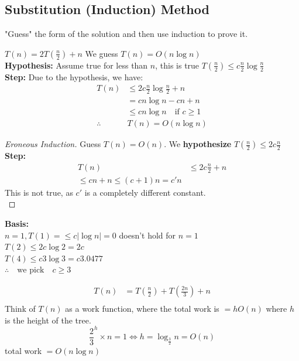 \subsection{Substitution (Induction) Method}
\begin{remark}
    "Guess" the form of the solution and then use induction to prove it.
\end{remark}

\begin{example}
    \label{ex:substitution_method}
    $T(n) = 2T\left(\frac{n}{2}\right) + n$ We guess $T(n) = O(n\log n)$\\
    \textbf{Hypothesis:} Assume true for less than $n$, this is true $T(\frac{n}{2}) \leq c\frac{n}{2}\log\frac{n}{2}$\\
    \textbf{Step: }
    Due to the hypothesis, we have:
    \begin{align*}
        T(n)       & \leq 2c\frac{n}{2}\log\frac{n}{2} + n   \\
                   & = cn\log n - cn + n                     \\
                   & \leq cn\log n \quad \text{if } c \geq 1 \\
        \therefore & T(n) = O(n\log n)
    \end{align*}
    \begin{proof}
        [Eroneous Induction]
        Guess $T(n) = O(n)$. We \textbf{hypothesize} $T(\frac{n}{2}) \leq 2c\frac{n}{2}$\\
        \textbf{Step:}
        \begin{align*}
            T(n) & \leq 2c\frac{n}{2} + n \\
            \leq cn + n \leq (c + 1)n = c'n
        \end{align*}
        This is not true, as $c'$ is a completely different constant.\\
    \end{proof}
    \textbf{Basis:} \\
    $n = 1, T(1) = \leq c |\log n| = 0$ doesn't hold for $n = 1$\\
    $T(2) \leq 2 c \log 2 = 2c $ \\
    $T(4) \leq c 3 \log 3 = c3.0477$ \\
    $ \therefore \quad \text{we pick} \quad c \geq 3$
\end{example}

\begin{example}

    \begin{align*}
        T(n) & = T(\frac{n}{2}) + T(\frac{2n}{3}) + n \\
    \end{align*}
    Think of $T(n)$ as a work function, where the total work is $= hO(n)$ where $h$ is the height of the tree. \\
    \[
        \frac{2}{3}^h \times n  = 1 \iff h = \log_{\frac{3}{2}} n = O(n) \]
    total work $= O(n\log n)$
\end{example}